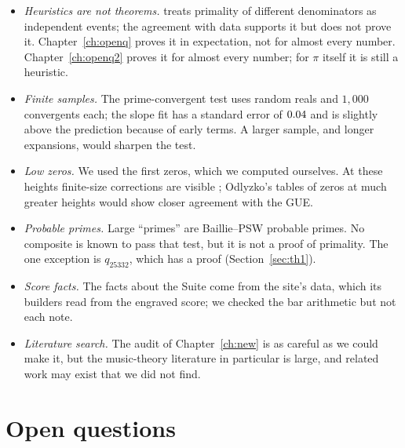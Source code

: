 \begin{itemize}
\item \emph{Heuristics are not theorems.}  treats primality of different denominators as independent events; the agreement with data supports it but does not prove it. Chapter~\ref{ch:openq} proves it in expectation, not for almost every number. \addedon{\revA} Chapter~\ref{ch:openq2} proves it for almost every number; for $\pi$ itself it is still a heuristic. \addedon{\revB}
\item \emph{Finite samples.} The prime-convergent test uses \RandM{} random reals and $1{,}000$ convergents each; the slope fit has a standard error of $0.04$ and is slightly above the prediction because of early terms. A larger sample, and longer expansions, would sharpen the test.
\item \emph{Low zeros.} We used the first \NZeros{} zeros, which we computed ourselves. At these heights finite-size corrections are visible \citep{Bogomolny2006,Berry1988}; Odlyzko's tables of zeros at much greater heights \citep{Odlyzko1987} would show closer agreement with the GUE.
\item \emph{Probable primes.} Large ``primes'' are Baillie--PSW probable primes. No composite is known to pass that test, but it is not a proof of primality. The one exception is $q_{25332}$, which has a proof (Section~\ref{sec:th1}). \addedon{\revG}
\item \emph{Score facts.} The facts about the Suite come from the site's data, which its builders read from the engraved score; we checked the bar arithmetic but not each note.
\item \emph{Literature search.} The audit of Chapter~\ref{ch:new} is as careful as we could make it, but the music-theory literature in particular is large, and related work may exist that we did not find.
\end{itemize}

\section{Open questions}\label{sec:open}

